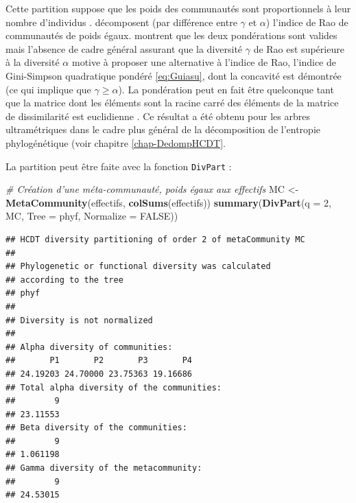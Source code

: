 \documentclass[
  11pt,
  french,
  a4paper,
  extrafontsizes,onecolumn,openright
  ]{memoir}
\newenvironment{Shaded}{\begin{snugshade}}{\end{snugshade}}
\newcommand{\CommentTok}[1]{\textcolor[rgb]{0.56,0.35,0.01}{\textit{#1}}}
\newcommand{\DataTypeTok}[1]{\textcolor[rgb]{0.13,0.29,0.53}{#1}}
\newcommand{\DecValTok}[1]{\textcolor[rgb]{0.00,0.00,0.81}{#1}}
\newcommand{\KeywordTok}[1]{\textcolor[rgb]{0.13,0.29,0.53}{\textbf{#1}}}
\newcommand{\NormalTok}[1]{#1}
\newcommand{\OtherTok}[1]{\textcolor[rgb]{0.56,0.35,0.01}{#1}}
\newcommand{\StringTok}[1]{\textcolor[rgb]{0.31,0.60,0.02}{#1}}
\begin{document}
Cette partition suppose que les poids des communautés sont proportionnels à leur nombre d'individus \autocite[Villeger2008]{Rao1982}.
\textcite{Hardy2007} décomposent (par différence entre \(\gamma\) et \(\alpha\)) l'indice de Rao de communautés de poids égaux.
\textcite{Hardy2008} montrent que les deux pondérations sont valides mais l'absence de cadre général assurant que la diversité \(\gamma\) de Rao est supérieure à la diversité \(\alpha\) \autocite{DeBello2010} motive \textcite{Guiasu2011} à proposer une alternative à l'indice de Rao, l'indice de Gini-Simpson quadratique pondéré \eqref{eq:Guiasu}, dont la concavité est démontrée (ce qui implique que \(\gamma\ge \alpha\)).
La pondération peut en fait être quelconque tant que la matrice dont les éléments sont la racine carré des éléments de la matrice de dissimilarité est euclidienne \autocite{Champely2002}.
Ce résultat a été obtenu pour les arbres ultramétriques dans le cadre plus général de la décomposition de l'entropie phylogénétique (voir chapitre \ref{chap-DedompHCDT}.

La partition peut être faite avec la fonction \texttt{DivPart} :

\scriptsize

\begin{Shaded}
\begin{Highlighting}[]
\CommentTok{# Création d'une méta-communauté, poids égaux aux effectifs}
\NormalTok{MC <-}\StringTok{ }\KeywordTok{MetaCommunity}\NormalTok{(effectifs, }\KeywordTok{colSums}\NormalTok{(effectifs))}
\KeywordTok{summary}\NormalTok{(}\KeywordTok{DivPart}\NormalTok{(}\DataTypeTok{q =} \DecValTok{2}\NormalTok{, MC, }\DataTypeTok{Tree =}\NormalTok{ phyf, }\DataTypeTok{Normalize =} \OtherTok{FALSE}\NormalTok{))}
\end{Highlighting}
\end{Shaded}

\begin{verbatim}
## HCDT diversity partitioning of order 2 of metaCommunity MC
## 
## Phylogenetic or functional diversity was calculated
## according to the tree 
## phyf 
## 
## Diversity is not normalized 
## 
## Alpha diversity of communities: 
##       P1       P2       P3       P4 
## 24.19203 24.70000 23.75363 19.16686 
## Total alpha diversity of the communities: 
##        9 
## 23.11553 
## Beta diversity of the communities: 
##        9 
## 1.061198 
## Gamma diversity of the metacommunity: 
##        9 
## 24.53015
\end{verbatim}

\normalsize
\end{document}
